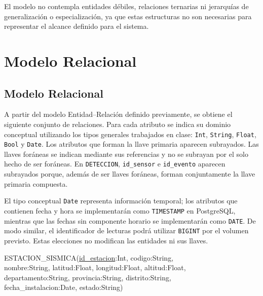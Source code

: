\documentclass[12pt,a4paper]{article}
\begin{document}
El modelo no contempla entidades débiles, relaciones ternarias ni jerarquías de generalización o especialización, ya que estas estructuras no son necesarias para representar el alcance definido para el sistema.


\section{Modelo Relacional}


\subsection{Modelo Relacional}

A partir del modelo Entidad--Relación definido previamente, se obtiene el siguiente conjunto de relaciones. Para cada atributo se indica su dominio conceptual utilizando los tipos generales trabajados en clase: \texttt{Int}, \texttt{String}, \texttt{Float}, \texttt{Bool} y \texttt{Date}. Los atributos que forman la llave primaria aparecen subrayados. Las llaves foráneas se indican mediante sus referencias y no se subrayan por el solo hecho de ser foráneas. En \texttt{DETECCION}, \texttt{id\_\allowbreak{}sensor} e \texttt{id\_\allowbreak{}evento} aparecen subrayados porque, además de ser llaves foráneas, forman conjuntamente la llave primaria compuesta.

El tipo conceptual \texttt{Date} representa información temporal; los atributos que contienen fecha y hora se implementarán como \texttt{TIMESTAMP} en PostgreSQL, mientras que las fechas sin componente horario se implementarán como \texttt{DATE}. De modo similar, el identificador de lecturas podrá utilizar \texttt{BIGINT} por el volumen previsto. Estas elecciones no modifican las entidades ni sus llaves.


\noindent
\begin{minipage}{\linewidth}
\small\ttfamily\raggedright
ESTACION\_SISMICA(\underline{id\_estacion}:Int, codigo:String,\\
nombre:String, latitud:Float, longitud:Float, altitud:Float,\\
departamento:String, provincia:String, distrito:String,\\
fecha\_instalacion:Date, estado:String)
\end{minipage}
\par\medskip
\end{document}
